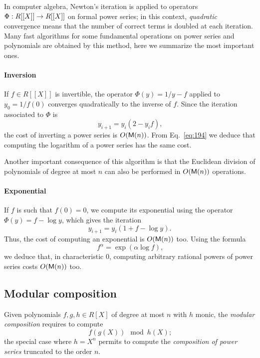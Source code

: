 In computer algebra, Newton's iteration is applied to operators
$\Phi:R[[X]]\rightarrow R[[X]]$ on formal power series; in this context,
\emph{quadratic} convergence means that the number of correct terms is
doubled at each iteration. Many fast algorithms for some fundamental
operations on power series and polynomials are obtained by this
method, here we summarize the most important ones.

\paragraph{Inversion}
If $f\in R[[X]]$ is invertible, the operator $\Phi(y) = 1/y - f$
applied to $y_0=1/f(0)$ converges quadratically to the inverse of
$f$. Since the iteration associated to $\Phi$ is
\begin{equation}
  \label{eq:193}
  y_{i+1} = y_i(2 - y_if)
  \text{,}
\end{equation}
the cost of inverting a power series is $O(\mathsf{M}(n))$. From
Eq.~\eqref{eq:194} we deduce that computing the logarithm of a power
series has the same cost.

Another important consequence of this algorithm is that the Euclidean
division of polynomials of degree at most $n$ can also be performed in
$O(\mathsf{M}(n))$ operations.

\paragraph{Exponential}
If $f$ is such that $f(0)=0$, we compute its exponential using the
operator $\Phi(y)=f-\log y$, which gives the iteration
\begin{equation}
  \label{eq:196}
  y_{i+1} = y_i(1 + f - \log y)
  \text{.}
\end{equation}
Thus, the cost of computing an exponential is $O(\mathsf{M}(n))$ too. Using
the formula
\begin{equation}
  \label{eq:201}
  f^\alpha = \exp(\alpha\log f)
  \text{,}
\end{equation}
we deduce that, in characteristic $0$, computing arbitrary rational
powers of power series costs $O(\mathsf{M}(n))$ too.


\subsection{Modular composition}
\label{sec:modular-composition}
Given polynomials $f,g,h\in R[X]$ of degree at most $n$ with $h$
monic, the \textit{modular composition}
requires to compute
\begin{equation}
  \label{eq:190}
  f(g(X)) \mod h(X)
  \text{;}
\end{equation}
the special case where $h=X^n$ permits to compute the
\textit{composition of power
  series} truncated to the order $n$.

